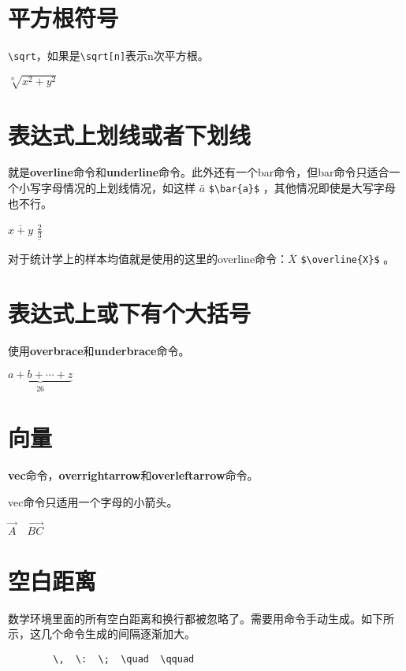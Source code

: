 \documentclass[11pt,oneside]{book}
\begin{document}
      \section{平方根符号}
      \verb+\sqrt+，如果是\verb+\sqrt[n]+表示n次平方根。

      $\sqrt[n]{x^2+y^2}$

      \section{表达式上划线或者下划线}
      就是\textbf{overline}命令和\textbf{underline}命令。此外还有一个bar命令，但bar命令只适合一个小写字母情况的上划线情况，如这样 $\bar{a}$ \verb+$\bar{a}$+ ，其他情况即使是大写字母也不行。

      $\overline{x+y}$  $\underline{\frac{2}{3}}$

      对于统计学上的样本均值就是使用的这里的overline命令：$\overline{X}$  \verb+$\overline{X}$+ 。


      \section{表达式上或下有个大括号}
      使用\textbf{overbrace}和\textbf{underbrace}命令。

      $\underbrace{ a+b+\cdots+z }_{26}$

      \section{向量}
      \textbf{vec}命令，\textbf{overrightarrow}和\textbf{overleftarrow}命令。

      vec命令只适用一个字母的小箭头。

      $\vec {A} \quad \overrightarrow{BC}$

      \section{空白距离}
      数学环境里面的所有空白距离和换行都被忽略了。需要用命令手动生成。如下所示，这几个命令生成的间隔逐渐加大。

      \begin{Verbatim}
        \,  \:  \;  \quad  \qquad
      \end{Verbatim}
\end{document}
